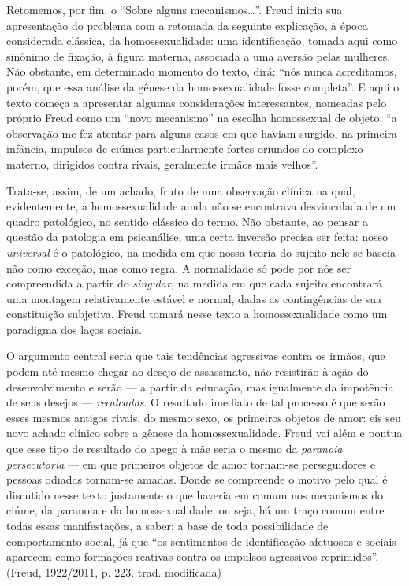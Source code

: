 Retomemos, por fim, o ``Sobre alguns mecanismos\ldots{}''. Freud inicia sua
apresentação do problema com a retomada da seguinte explicação, à época
considerada clássica, da homossexualidade: uma identificação, tomada
aqui como sinônimo de fixação, à figura materna, associada a uma aversão
pelas mulheres. Não obstante, em determinado momento do texto, dirá:
``nós nunca acreditamos, porém, que essa análise da gênese da
homossexualidade fosse completa''. E aqui o texto começa a apresentar
algumas considerações interessantes, nomeadas pelo próprio Freud como um
``novo mecanismo'' na escolha homossexual de objeto: ``a observação me
fez atentar para alguns casos em que haviam surgido, na primeira
infância, impulsos de ciúmes particularmente fortes oriundos do complexo
materno, dirigidos contra rivais, geralmente irmãos mais velhos''.

Trata-se, assim, de um achado, fruto de uma observação clínica na qual,
evidentemente, a homossexualidade ainda não se encontrava desvinculada
de um quadro patológico, no sentido clássico do termo. Não obstante, ao
pensar a questão da patologia em psicanálise, uma certa inversão precisa
ser feita: nosso \emph{universal} é o patológico, na medida em que nossa
teoria do sujeito nele se baseia não como exceção, mas como regra. A
normalidade só pode por nós ser compreendida a partir do
\emph{singular}, na medida em que cada sujeito encontrará uma montagem
relativamente estável e normal, dadas as contingências de sua
constituição subjetiva. Freud tomará nesse texto a homossexualidade como
um paradigma dos laços sociais.

O argumento central seria que tais tendências agressivas contra os
irmãos, que podem até mesmo chegar ao desejo de assassinato, não
resistirão à ação do desenvolvimento e serão --- a partir da educação,
mas igualmente da impotência de seus desejos --- \emph{recalcadas}. O
resultado imediato de tal processo é que serão esses mesmos antigos
rivais, do mesmo sexo, os primeiros objetos de amor: eis seu novo achado
clínico sobre a gênese da homossexualidade. Freud vai além e pontua que
esse tipo de resultado do apego à mãe seria o mesmo da \emph{paranoia
persecutoria} --- em que primeiros objetos de amor tornam-se
perseguidores e pessoas odiadas tornam-se amadas. Donde se compreende o
motivo pelo qual é discutido nesse texto justamente o que haveria em
comum nos mecanismos do ciúme, da paranoia e da homossexualidade; ou
seja, há um traço comum entre todas essas manifestações, a saber: a base
de toda possibilidade de comportamento social, já que ``os sentimentos
de identificação afetuosos e sociais aparecem como formações reativas
contra os impulsos agressivos reprimidos''. (Freud, 1922/2011, p. 223.
trad. modificada)

